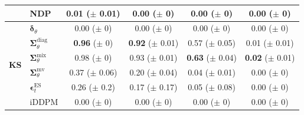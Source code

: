 \begin{tabular}{|l|l|cccc|}
        & NDP & \makecell{0.01 \\ ($\pm$ 0.01)} & \makecell{0.00 \\ ($\pm$ 0)} & \makecell{0.00 \\ ($\pm$ 0)} & \makecell{0.00 \\ ($\pm$ 0)} \\
        \midrule
        \multirow{8}{*}{\textbf{KS}}
        & $\bm\delta_\theta$ & \makecell{0.00 \\ ($\pm$ 0)} & \makecell{0.00 \\ ($\pm$ 0)} & \makecell{0.00 \\ ($\pm$ 0)} & \makecell{0.00 \\ ($\pm$ 0)} \\
        & $\bm\Sigma_\theta^{\mathrm{diag}}$ & \makecell{\textbf{0.96} \\ ($\pm$ 0)} & \makecell{\textbf{0.92} \\ ($\pm$ 0.01)} & \makecell{0.57 \\ ($\pm$ 0.05)} & \makecell{0.01 \\ ($\pm$ 0.01)} \\
        & $\bm\Sigma_\theta^{\mathrm{mix}}$ & \makecell{0.98 \\ ($\pm$ 0)} & \makecell{0.93 \\ ($\pm$ 0.01)} & \makecell{\textbf{0.63} \\ ($\pm$ 0.04)} & \makecell{\textbf{0.02} \\ ($\pm$ 0.01)} \\
        & $\bm\Sigma_\theta^{\mathrm{mv}}$ & \makecell{0.37 \\ ($\pm$ 0.06)} & \makecell{0.20 \\ ($\pm$ 0.04)} & \makecell{0.04 \\ ($\pm$ 0.01)} & \makecell{0.00 \\ ($\pm$ 0)} \\
        & $\bm\epsilon_t^\mathrm{ES}$ & \makecell{0.26 \\ ($\pm$ 0.2)} & \makecell{0.17 \\ ($\pm$ 0.17)} & \makecell{0.05 \\ ($\pm$ 0.08)} & \makecell{0.00 \\ ($\pm$ 0)} \\
        & iDDPM & \makecell{0.00 \\ ($\pm$ 0)} & \makecell{0.00 \\ ($\pm$ 0)} & \makecell{0.00 \\ ($\pm$ 0)} & \makecell{0.00 \\ ($\pm$ 0)} \\

\end{tabular}
